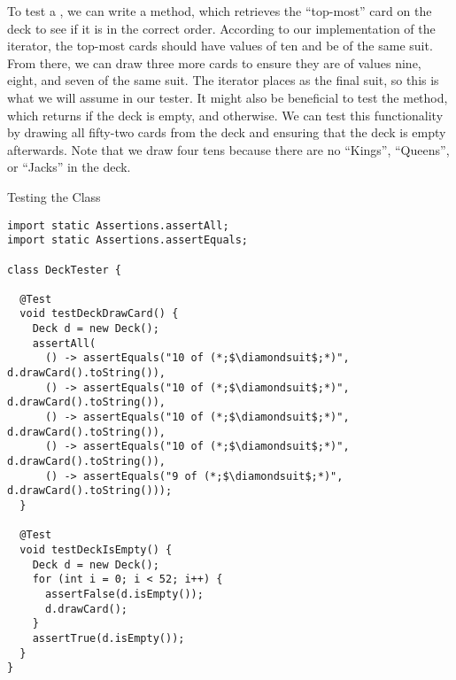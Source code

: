 To test a , we can write a  method, which retrieves the ``top-most'' card on the deck to see if it is in the correct order. According to our implementation of the iterator, the top-most cards should have values of ten and be of the same suit. From there, we can draw three more cards to ensure they are of values nine, eight, and seven of the same suit. The iterator places  as the final suit, so this is what we will assume in our tester. It might also be beneficial to test the  method, which returns  if the deck is empty, and  otherwise. We can test this functionality by drawing all fifty-two cards from the deck and ensuring that the deck is empty afterwards. Note that we draw four tens because there are no ``Kings'', ``Queens'', or ``Jacks'' in the deck.

\begin{cl}{Testing the  Class}
\begin{lstlisting}[language=MyJava]
import static Assertions.assertAll;
import static Assertions.assertEquals;

class DeckTester {

  @Test
  void testDeckDrawCard() {
    Deck d = new Deck();
    assertAll(
      () -> assertEquals("10 of (*;$\diamondsuit$;*)", d.drawCard().toString()),
      () -> assertEquals("10 of (*;$\diamondsuit$;*)", d.drawCard().toString()),
      () -> assertEquals("10 of (*;$\diamondsuit$;*)", d.drawCard().toString()),
      () -> assertEquals("10 of (*;$\diamondsuit$;*)", d.drawCard().toString()),
      () -> assertEquals("9 of (*;$\diamondsuit$;*)", d.drawCard().toString()));
  }

  @Test
  void testDeckIsEmpty() {
    Deck d = new Deck();
    for (int i = 0; i < 52; i++) {
      assertFalse(d.isEmpty());
      d.drawCard();
    }
    assertTrue(d.isEmpty());
  }
}
\end{lstlisting}
\end{cl}


